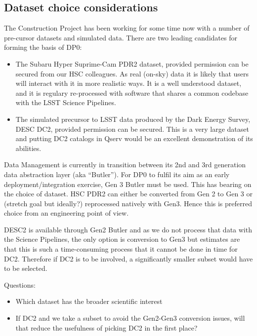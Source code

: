 \subsection {Dataset choice considerations} \label{sec:dataset}

The Construction Project has been working for some time now with a number of pre-cursor datasets and simulated data. There are two leading candidates for forming the basis of DP0:

\begin{itemize}
  
\item The Subaru Hyper Suprime-Cam PDR2 dataset, provided permission can be secured from our HSC colleagues. As real (on-sky) data it is likely that users will interact with it in more realistic ways. It is a well understood dataset, and it is regulary re-processed with software that shares a common codebase with the LSST Science Pipelines. 

\item The simulated precursor to LSST data produced by the Dark Energy Survey, DESC DC2, provided permission can be secured. This is a very large dataset and putting DC2 catalogs in Qserv would be an excellent demonstration of its abilities.

\end{itemize}

Data Management is currently in transition between its 2nd and 3rd generation data abstraction layer (aka ``Butler''). For DP0 to fulfil its aim as an early deployment/integration exercise, Gen 3 Butler must be used. This has bearing on the choice of dataset. HSC PDR2 can either be converted from Gen 2 to Gen 3 or (stretch goal but ideally?) reprocessed natively with Gen3. Hence this is preferred choice from an engineering point of view. 

DESC2 is available through Gen2 Butler and as we do not process that data with the Science Pipelines, the only option is conversion to Gen3 but estimates are that this is such a time-consuming process that it cannot be done in time for DC2. Therefore if DC2 is to be involved, a significantly smaller subset would have to be selected. 

Questions:

\begin{itemize}
  
\item Which dataset has the broader scientific interest

\item If DC2 and we take a subset to avoid the Gen2-Gen3 conversion issues, will that reduce the usefulness of picking DC2 in the first place?

\end{itemize}

